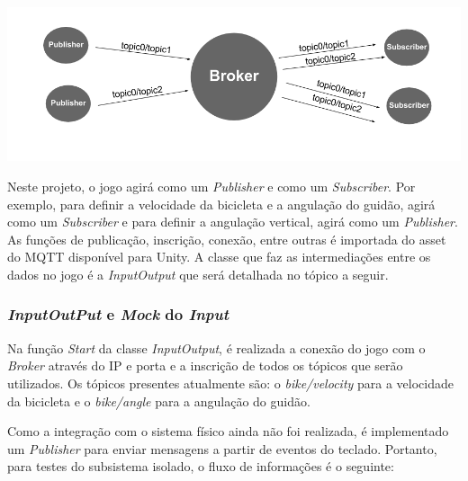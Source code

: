 \begin{center}
	\includegraphics[scale=0.4]{figuras/MQTT}
	\label{figura:mqttsoft}
\end{center}


Neste projeto, o jogo agirá como um \textit{Publisher} e como um \textit{Subscriber}. Por exemplo, para definir a velocidade da bicicleta e a angulação do guidão, agirá como um \textit{Subscriber} e para definir a angulação vertical, agirá como um \textit{Publisher}. As funções de publicação, inscrição, conexão, entre outras é importada do asset do MQTT disponível para Unity.  A classe que faz as intermediações entre os dados no jogo é a \textit{InputOutput} que será detalhada no tópico a seguir.

\subsubsection{\textit{InputOutPut} e \textit{Mock} do \textit{Input}}

Na função \textit{Start} da classe  \textit{InputOutput}, é realizada a conexão do jogo com o \textit{Broker} através do IP e porta e a inscrição de todos os tópicos que serão utilizados. Os tópicos presentes atualmente são: o \textit{bike/velocity} para a velocidade da bicicleta e o \textit{bike/angle} para a angulação do guidão.

Como a integração com o sistema físico ainda não foi realizada, é implementado um \textit{Publisher} para enviar mensagens a partir de eventos do teclado. Portanto, para testes do subsistema isolado, o fluxo de informações é o seguinte:

